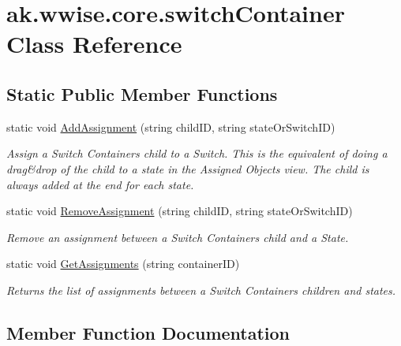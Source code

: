\hypertarget{classak_1_1wwise_1_1core_1_1switch_container}{}\section{ak.\+wwise.\+core.\+switch\+Container Class Reference}
\label{classak_1_1wwise_1_1core_1_1switch_container}
\subsection*{Static Public Member Functions}
\begin{DoxyCompactItemize}
\item 
static void \mbox{\hyperlink{classak_1_1wwise_1_1core_1_1switch_container_ace30cbc9fb9efeb97303649ec7164f77}{Add\+Assignment}} (string child\+ID, string state\+Or\+Switch\+ID)
\begin{DoxyCompactList}\small\item\em Assign a Switch Container\textquotesingle{}s child to a Switch. This is the equivalent of doing a drag\&drop of the child to a state in the Assigned Objects view. The child is always added at the end for each state. \end{DoxyCompactList}\item 
static void \mbox{\hyperlink{classak_1_1wwise_1_1core_1_1switch_container_a54352aa359957b104c3d499943d979b1}{Remove\+Assignment}} (string child\+ID, string state\+Or\+Switch\+ID)
\begin{DoxyCompactList}\small\item\em Remove an assignment between a Switch Container\textquotesingle{}s child and a State. \end{DoxyCompactList}\item 
static void \mbox{\hyperlink{classak_1_1wwise_1_1core_1_1switch_container_acb318b35c61f65b8b09466294e44ef52}{Get\+Assignments}} (string container\+ID)
\begin{DoxyCompactList}\small\item\em Returns the list of assignments between a Switch Container\textquotesingle{}s children and states. \end{DoxyCompactList}\end{DoxyCompactItemize}


\subsection{Member Function Documentation}
\mbox{\label{classak_1_1wwise_1_1core_1_1switch_container_ace30cbc9fb9efeb97303649ec7164f77}} 
